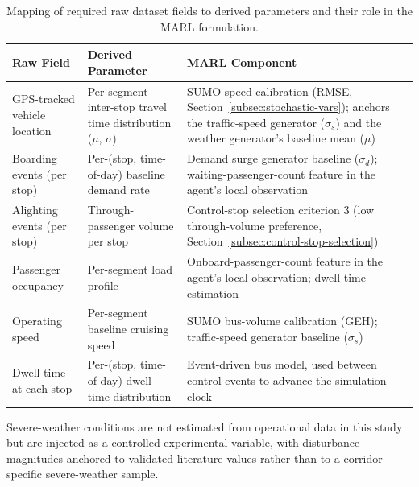 \begin{table}[htbp]
\centering
\caption{Mapping of required raw dataset fields to derived parameters and their role in the MARL formulation.}
\label{tab:field-mapping}
\small
\renewcommand{\arraystretch}{1.25}

\begin{tabularx}{\textwidth}{
>{\RaggedRight\arraybackslash}p{}
>{\RaggedRight\arraybackslash}p{}
>{\RaggedRight\arraybackslash}X
}

\toprule
\textbf{Raw Field} & \textbf{Derived Parameter} & \textbf{MARL Component} \\
\midrule

GPS-tracked vehicle location &
Per-segment inter-stop travel time distribution ($\mu$, $\sigma$) &
SUMO speed calibration (RMSE, Section~\ref{subsec:stochastic-vars}); anchors the traffic-speed generator ($\sigma_s$) and the weather generator's baseline mean ($\mu$) \\

Boarding events (per stop) &
Per-(stop, time-of-day) baseline demand rate &
Demand surge generator baseline ($\sigma_d$); waiting-passenger-count feature in the agent's local observation \\

Alighting events (per stop) &
Through-passenger volume per stop &
Control-stop selection criterion 3 (low through-volume preference, Section~\ref{subsec:control-stop-selection}) \\

Passenger occupancy &
Per-segment load profile &
Onboard-passenger-count feature in the agent's local observation; dwell-time estimation \\

Operating speed &
Per-segment baseline cruising speed &
SUMO bus-volume calibration (GEH); traffic-speed generator baseline ($\sigma_s$) \\

Dwell time at each stop &
Per-(stop, time-of-day) dwell time distribution &
Event-driven bus model, used between control events to advance the simulation clock \\

\bottomrule
\end{tabularx}
\end{table}

Severe-weather conditions are not estimated from operational data in this study but are injected as a controlled experimental variable, with disturbance magnitudes anchored to validated literature values rather than to a corridor-specific severe-weather sample.

